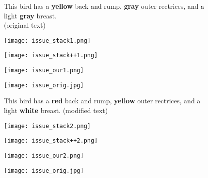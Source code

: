 \documentclass{article}
\begin{document}
\begin{figure}[t]
\begin{minipage}{\textwidth}
\quad\begin{minipage}{0.4\textwidth}\raggedright
\small
This bird has a \textbf{yellow} back and rump, 
\textbf{gray} outer rectrices, and a light \textbf{gray} breast.\\
(original text)
\end{minipage}
\quad\begin{minipage}{0.12\textwidth}
\texttt{[image: issue\_stack1.png]}
\end{minipage}
\begin{minipage}{0.12\textwidth}
\texttt{[image: issue\_stack++1.png]}
\end{minipage}
\begin{minipage}{0.12\textwidth}
\texttt{[image: issue\_our1.png]}
\end{minipage}
\begin{minipage}{0.12\textwidth}
\texttt{[image: issue\_orig.jpg]}
\end{minipage}

\quad\begin{minipage}{0.4\textwidth}\raggedright
\small
This bird has a \textbf{red} back and rump, 
\textbf{yellow} outer rectrices, and a light \textbf{white} breast. (modified text)\\
\end{minipage}
\quad\begin{minipage}{0.12\textwidth}
\texttt{[image: issue\_stack2.png]}
\end{minipage}
\begin{minipage}{0.12\textwidth}
\texttt{[image: issue\_stack++2.png]}
\end{minipage}
\begin{minipage}{0.12\textwidth}
\texttt{[image: issue\_our2.png]}
\end{minipage}
\begin{minipage}{0.12\textwidth}
\texttt{[image: issue\_orig.jpg]}
\end{minipage}
\medskip


\end{minipage}
\end{figure}
\end{document}
